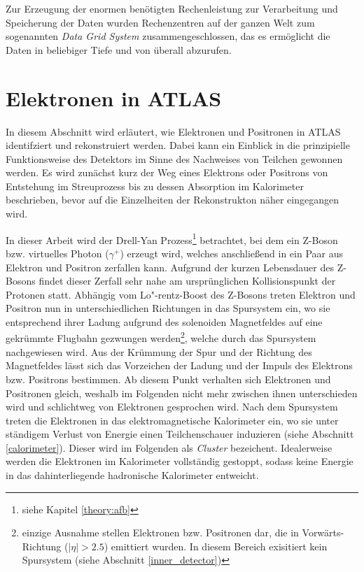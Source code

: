 Zur Erzeugung der enormen benötigten Rechenleistung zur Verarbeitung und
Speicherung der Daten wurden Rechenzentren auf der ganzen Welt zum sogenannten
\textit{Data Grid System} zusammengeschlossen, das es ermöglicht die Daten in
beliebiger Tiefe und von überall abzurufen.


%
\section{Elektronen in ATLAS}
\label{electrons}

In diesem Abschnitt wird erläutert, wie Elektronen und Positronen in ATLAS
identifziert und rekonstruiert werden. Dabei kann ein Einblick in die
prinzipielle Funktionsweise des Detektors im Sinne des Nachweises von Teilchen
gewonnen werden. Es wird zunächst kurz der Weg eines Elektrons oder Positrons
von Entstehung im Streuprozess bis zu dessen Absorption im Kalorimeter
beschrieben, bevor auf die Einzelheiten der Rekonstrukton näher eingegangen
wird.

In dieser Arbeit wird der Drell-Yan Prozess\footnote{siehe Kapitel
\ref{theory:afb}} betrachtet, bei dem ein Z-Boson bzw. virtuelles Photon
($\gamma^+$) erzeugt wird, welches anschließend in ein Paar aus Elektron und
Positron zerfallen kann. Aufgrund der kurzen Lebensdauer des Z-Bosons findet
dieser Zerfall sehr nahe am ursprünglichen Kollisionspunkt der Protonen statt.
Abhängig vom Lo"-rentz-Boost des Z-Bosons treten Elektron und Positron nun in
unterschiedlichen Richtungen in das Spursystem ein, wo sie entsprechend ihrer
Ladung aufgrund des solenoiden Magnetfeldes auf eine gekrümmte Flugbahn
gezwungen werden\footnote{einzige Ausnahme stellen Elektronen bzw. Positronen
dar, die in Vorwärts-Richtung ($|\eta|>2.5$) emittiert wurden. In diesem
Bereich exisitiert kein Spursystem (siehe Abschnitt \ref{inner_detector})},
welche durch das Spursystem nachgewiesen wird. Aus der Krümmung der Spur und
der Richtung des Magnetfeldes lässt sich das Vorzeichen der Ladung und der
Impuls des Elektrons bzw. Positrons bestimmen. Ab diesem Punkt verhalten sich
Elektronen und Positronen gleich, weshalb im Folgenden nicht mehr zwischen
ihnen unterschieden wird und schlichtweg von Elektronen gesprochen wird. Nach
dem Spursystem treten die Elektronen in das elektromagnetische Kalorimeter ein,
wo sie unter ständigem Verlust von Energie einen Teilchenschauer induzieren
(siehe Abschnitt \ref{calorimeter}). Dieser wird im Folgenden als
\textit{Cluster} bezeichent. Idealerweise werden die Elektronen im Kalorimeter
vollständig gestoppt, sodass keine Energie in das dahinterliegende hadronische
Kalorimeter entweicht.



